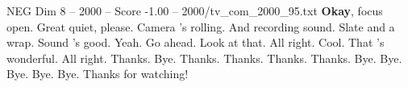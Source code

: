 \begin{textsample}{NEG Dim 8 – 2000 – Score -1.00 – 2000/tv\_com\_2000\_95.txt}  \label{ex:f8_neg_063}
\textbf{Okay}, focus open.
Great quiet, please.
Camera 's rolling.
And recording sound.
Slate and a wrap.
Sound 's good.
Yeah.
Go ahead.
Look at that.
All right.
Cool.
That 's wonderful.
All right.
Thanks.
Bye.
Thanks.
Thanks.
Thanks.
Thanks.
Bye.
Bye.
Bye.
Bye.
Bye.
Thanks for watching!

\end{textsample}
